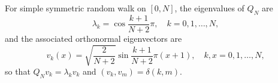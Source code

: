 For simple symmetric random walk on \([0,N]\), the eigenvalues of \(Q_N\) are
\[
\lambda_k = \cos\frac{k+1}{N+2}\pi, \quad k = 0,1,\dots,N,
\]
and the associated orthonormal eigenvectors are
\[
v_k(x) = \sqrt{\frac{2}{N+2}} \sin\frac{k+1}{N+2}\pi(x+1), \quad k,x = 0,1,\dots,N,
\]
so that \(Q_N v_k = \lambda_k v_k\) and \((v_k, v_m) = \delta(k,m)\).
